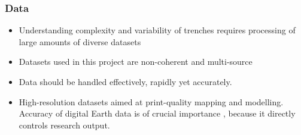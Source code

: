 \documentclass[pdflatex,compress,8pt,
	xcolor={dvipsnames,svgnames,x11names,table},
	hyperref={colorlinks = true,breaklinks = true, urlcolor = NavyBlue}]{beamer}
\begin{document}
\begin{frame}\frametitle{Data}
\vspace{1em}
\begin{itemize}\footnotesize
            \item Understanding complexity and variability of trenches requires processing of large amounts of diverse datasets 
            \item Datasets used in this project are non-coherent and multi-source 
            \item Data should be handled effectively, rapidly yet accurately.
            \item High-resolution datasets aimed at print-quality mapping and modelling. Accuracy of digital Earth data is of crucial importance \cite{Smith}, because it directly controls research output. 
\end{itemize}


\end{frame}
\end{document}
